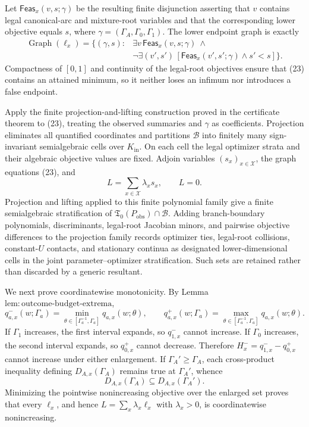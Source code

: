 Let \(\mathsf{Feas}_x(v,s;\gamma)\) be the resulting finite disjunction asserting that \(v\) contains legal canonical-arc and mixture-root variables and that the corresponding lower objective equals \(s\), where \(\gamma=(\Gamma_A,\Gamma_0,\Gamma_1)\).  The lower endpoint graph is exactly
\[
\begin{split}
 \operatorname{Graph}(\ell_x)=\{(\gamma,s):{}&
 \exists v\,\mathsf{Feas}_x(v,s;\gamma)\ \wedge\\
 &\neg\exists(v',s')\,[\mathsf{Feas}_x(v',s';\gamma)\wedge s'<s]\}.
\end{split}                                                             \tag{23}
\]
Compactness of \([0,1]\) and continuity of the legal-root objectives ensure that (23) contains an attained minimum, so it neither loses an infimum nor introduces a false endpoint.

Apply the finite projection-and-lifting construction proved in the certificate theorem to (23), treating the observed summaries and \(\gamma\) as coefficients.  Projection eliminates all quantified coordinates and partitions \(\mathcal B\) into finitely many sign-invariant semialgebraic cells over \(K_{\mathrm{in}}\).  On each cell the legal optimizer strata and their algebraic objective values are fixed.  Adjoin variables \((s_x)_{x\in\mathcal X}\), the graph equations (23), and
\[
 L=\sum_{x\in\mathcal X}\lambda_xs_x,
 \qquad L=0.                                                            \tag{24}
\]
Projection and lifting applied to this finite polynomial family give a finite semialgebraic stratification of \(\mathfrak T_0(P_{\mathrm{obs}})\cap\mathcal B\).  Adding branch-boundary polynomials, discriminants, legal-root Jacobian minors, and pairwise objective differences to the projection family records optimizer ties, legal-root collisions, constant-\(U\) contacts, and stationary continua as designated lower-dimensional cells in the joint parameter--optimizer stratification.  Such sets are retained rather than discarded by a generic resultant.

We next prove coordinatewise monotonicity.  By Lemma \(\mathrm{lem{:}outcome\text{-}budget\text{-}extrema}\),
\[
 q^-_{a,x}(w;\Gamma_a)
 =\min_{\theta\in[\Gamma_a^{-1},\Gamma_a]}q_{a,x}(w;\theta),
 \qquad
 q^+_{a,x}(w;\Gamma_a)
 =\max_{\theta\in[\Gamma_a^{-1},\Gamma_a]}q_{a,x}(w;\theta).           \tag{25}
\]
If \(\Gamma_1\) increases, the first interval expands, so \(q^-_{1,x}\) cannot increase.  If \(\Gamma_0\) increases, the second interval expands, so \(q^+_{0,x}\) cannot decrease.  Therefore \(H_x^-=q^-_{1,x}-q^+_{0,x}\) cannot increase under either enlargement.  If \(\Gamma_A'\geq\Gamma_A\), each cross-product inequality defining \(D_{A,x}(\Gamma_A)\) remains true at \(\Gamma_A'\), whence
\[
 D_{A,x}(\Gamma_A)\subseteq D_{A,x}(\Gamma_A').                        \tag{26}
\]
Minimizing the pointwise nonincreasing objective over the enlarged set proves that every \(\ell_x\), and hence \(L=\sum_x\lambda_x\ell_x\) with \(\lambda_x>0\), is coordinatewise nonincreasing.

